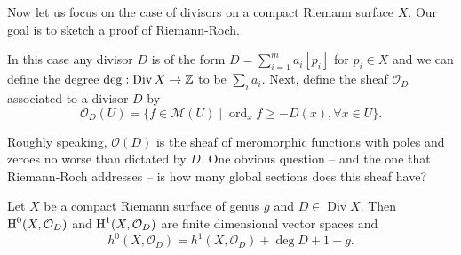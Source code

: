 \documentclass{amsart}
\DeclareMathOperator{\ord}{ord}
\DeclareMathOperator{\Div}{Div}
\begin{document}
Now let us focus on the case of divisors on a compact Riemann surface $X$. Our goal is to sketch a proof of 
Riemann-Roch.

\begin{definition}
    In this case any divisor $D$ is of the form $D=\sum_{i=1}^m a_i[p_i]$ for $p_i\in X$ and we can define
    the {\color{blue} degree} $\deg: \Div X \to\Z$ to be $\sum_i a_i$. Next, define the sheaf $\mathcal{O}_D$
    associated to a divisor $D$ by
    \begin{equation*}
        \mathcal{O}_D(U) = \{ f\in\mathcal{M}(U) \mid \ord_x f\geqslant -D(x), \forall x\in U\}.
    \end{equation*}
\end{definition}

Roughly speaking, $\mathcal{O}(D)$ is the sheaf of meromorphic functions with poles and zeroes no worse than dictated
by $D$. One obvious question -- and the one that Riemann-Roch addresses -- is how many global sections does this
sheaf have?

\begin{theorem}
    Let $X$ be a compact Riemann surface of genus $g$ and $D\in\Div X$. Then $\operatorname{H}^0(X,\mathcal{O}_D)$ and
    $\operatorname{H}^1(X,\mathcal{O}_D)$ are finite dimensional vector spaces and
    \begin{equation*}
        h^0(X,\mathcal{O}_D) = h^1(X, \mathcal{O}_D) + \deg D + 1 - g.
    \end{equation*}
\end{theorem}
\end{document}

